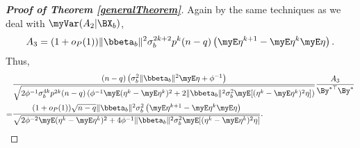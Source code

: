 \begin{proof}[\textbf{Proof of Theorem \ref{generalTheorem}}]
Again by the same techniques as we deal with $\myVar (A_2 | \BX_b)$, 
\begin{equation*}
    A_3=
    (1+o_P(1)) \|\bbeta_b\|^2 \sigma_b^{2k+2} p^{k} (n-q) \left(\myE \eta^{k+1} - \myE \eta^k \myE \eta\right)
    .
\end{equation*}
Thus,
\begin{equation}\label{eq:raA3}
    \begin{split}
    &\frac{
        (n-q)\left(
        \sigma_b^2 \|\bbeta_b\|^2  \myE \eta
+\phi^{-1}
\right)
    }{\sqrt{
            2\phi^{-1}
            \sigma_b^{4k} p^{2k}
            (n-q)
            \left( 
                \phi^{-1} \myE (\eta^k - \myE \eta^k)^2
                +
                2\|\bbeta_b\|^2 \sigma_b^2 \myE [(\eta^k - \myE \eta^k)^2\eta]
            \right)
    }}
    \frac{
        A_3
    }{\By^{*\top} \By^*}
    \\
    =&
    \frac{
        (1+o_P(1)) \sqrt{n-q} \|\bbeta_b\|^2 \sigma_b^{2}  \left(\myE \eta^{k+1} - \myE \eta^k \myE \eta\right)
    }{\sqrt{
                2\phi^{-2} \myE (\eta^k - \myE \eta^k)^2
                +
            4\phi^{-1}
                \|\bbeta_b\|^2 \sigma_b^2 \myE [(\eta^k - \myE \eta^k)^2\eta]
        }}.
    \end{split}
\end{equation}


\end{proof}
